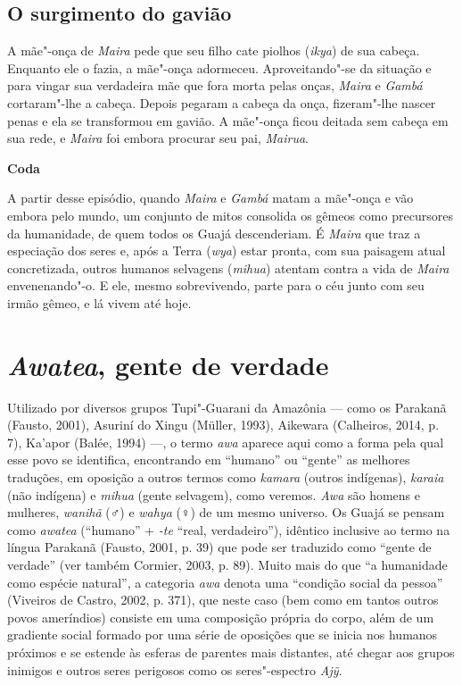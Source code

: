 \subsection{O surgimento do gavião}

\forceindent A mãe"-onça de \emph{Maira} pede que seu filho cate piolhos (\emph{ikya})
de sua cabeça. Enquanto ele o fazia, a mãe"-onça adormeceu.
Aproveitando"-se da situação e para vingar sua verdadeira mãe que fora
morta pelas onças, \emph{Maira} e \emph{Gambá} cortaram"-lhe a cabeça.
Depois pegaram a cabeça da onça, fizeram"-lhe nascer penas e ela se
transformou em gavião. A mãe"-onça ficou deitada sem cabeça em sua rede,
e \emph{Maira} foi embora procurar seu pai, \emph{Mairua}.

\textbf{Coda}

A partir desse episódio, quando \emph{Maira} e \emph{Gambá} matam a
mãe"-onça e vão embora pelo mundo, um conjunto de mitos consolida os
gêmeos como precursores da humanidade, de quem todos os Guajá
descenderiam. É \emph{Maira} que traz a especiação dos seres e, após a
Terra (\emph{wya}) estar pronta, com sua paisagem atual concretizada,
outros humanos selvagens (\emph{mihua}) atentam contra a vida de
\emph{Maira} envenenando"-o. E ele, mesmo sobrevivendo, parte para o céu
junto com seu irmão gêmeo, e lá vivem até hoje.

\section{\emph{Awatea}, gente de verdade}\label{awatea-gente-de-verdade}

Utilizado por diversos grupos Tupi"-Guarani da Amazônia --- como os
Parakanã (Fausto, 2001), Asuriní do Xingu (Müller, 1993), Aikewara
(Calheiros, 2014, p. 7), Ka'apor (Balée, 1994) ---, o termo \emph{awa}
aparece aqui como a forma pela qual esse povo se identifica, encontrando
em ``humano'' ou ``gente'' as melhores traduções, em oposição a outros
termos como \emph{kamara} (outros indígenas), \emph{karaia} (não
indígena) e \emph{mihua} (gente selvagem), como veremos. \emph{Awa} são
homens e mulheres, \emph{wanihã} (♂) e \emph{wahya} (♀) de um
mesmo universo. Os Guajá se pensam como \emph{awatea} (``humano'' +
\emph{-te} ``real, verdadeiro''), idêntico inclusive ao termo na língua
Parakanã (Fausto, 2001, p. 39) que pode ser traduzido como ``gente de
verdade'' (ver também Cormier, 2003, p. 89). Muito mais do que ``a
humanidade como espécie natural'', a categoria \emph{awa} denota uma
``condição social da pessoa'' (Viveiros de Castro, 2002, p. 371), que
neste caso (bem como em tantos outros povos ameríndios) consiste em uma
composição própria do corpo, além de um gradiente social formado por uma
série de oposições que se inicia nos humanos próximos e se estende às
esferas de parentes mais distantes, até chegar aos grupos inimigos e
outros seres perigosos como os seres"-espectro \emph{Ajỹ}.


